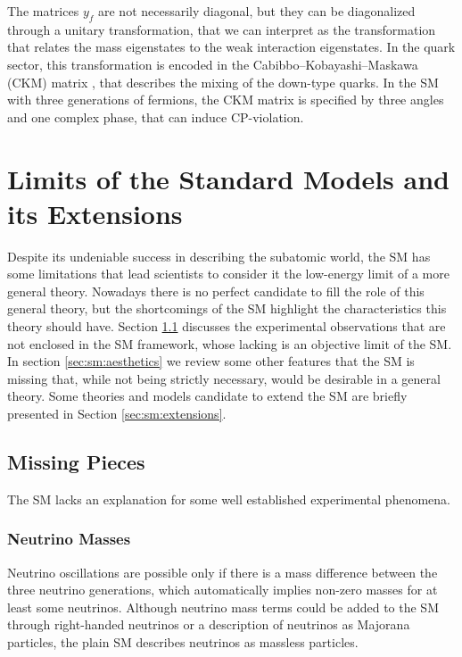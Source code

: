 The matrices $y_f$ are not necessarily diagonal, but they can be diagonalized through a unitary transformation, that we can interpret as the transformation that relates the mass eigenstates to the weak interaction eigenstates. In the quark sector, this transformation is encoded in the Cabibbo–Kobayashi–Maskawa (CKM) matrix \cite{Cabibbo:1963yz}\cite{Kobayashi:1973fv}, that describes the mixing of the down-type quarks. In the SM with three generations of fermions, the CKM matrix is specified by three angles and one complex phase, that can induce CP-violation.


\section{Limits of the Standard Models and its Extensions}
\label{sec:smsusy:bsm}

Despite its undeniable success in describing the subatomic world, the SM has some limitations that lead scientists to consider it the low-energy limit of a more general theory. Nowadays there is no perfect candidate to fill the role of this general theory, but the shortcomings of the SM highlight the characteristics this theory should have. Section \ref{sec:sm:missingpieces} discusses the experimental observations that are not enclosed in the SM framework, whose lacking is an objective limit of the SM. In section \ref{sec:sm:aesthetics} we review some other features that the SM is missing that, while not being strictly necessary, would be desirable in a general theory. Some theories and models candidate to extend the SM are briefly presented in Section \ref{sec:sm:extensions}.

\subsection{Missing Pieces}
\label{sec:sm:missingpieces}

The SM lacks an explanation for some well established experimental phenomena. 

\subsubsection*{Neutrino Masses}

Neutrino oscillations \cite{PhysRevLett.81.1562} are possible only if there is a mass difference between the three neutrino generations, which automatically implies non-zero masses for at least some neutrinos. Although neutrino mass terms could be added to the SM through right-handed neutrinos or a description of neutrinos as Majorana particles, the plain SM describes neutrinos as massless particles.

